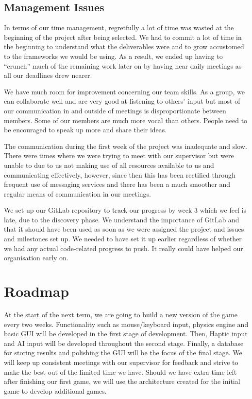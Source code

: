 \documentclass[a4paper]{article}
\begin{document}
\subsection{Management Issues}
In terms of our time management, regretfully a lot of time was wasted at the beginning of the project after being selected. We had to commit a lot of time in the beginning to understand what the deliverables were and to grow accustomed to the frameworks we would be using. As a result, we ended up having to “crunch” much of the remaining work later on by having near daily meetings as all our deadlines drew nearer.

We have much room for improvement concerning our team skills. As a group, we can collaborate well and are very good at listening to others’ input but most of our communication in and outside of meetings is disproportionate between members. Some of our members are much more vocal than others. People need to be encouraged to speak up more and share their ideas.

The communication during the first week of the project was inadequate and slow. There were times where we were trying to meet with our supervisor but were unable to due to us not making use of all resources available to us and communicating effectively, however, since then this has been rectified through frequent use of messaging services and there has been a much smoother and regular means of communication in our meetings. 

We set up our GitLab repository to track our progress by week 3 which we feel is late, due to the discovery phase. We understand the importance of GitLab and that it should have been used as soon as we were assigned the project and issues and milestones set up. We needed to have set it up earlier regardless of whether we had any actual code-related progress to push. It really could have helped our organisation early on.

\section{Roadmap}
At the start of the next term, we are going to build a new version of the game every two weeks. Functionality such as mouse/keyboard input, physics engine and basic GUI will be developed in the first stage of development. Then, Haptic input and AI input will be developed throughout the second stage. Finally, a database for storing results and polishing the GUI will be the focus of the final stage. We will keep up consistent meetings with our supervisor for feedback and strive to make the best out of the limited time we have. Should we have extra time left after finishing our first game, we will use the architecture created for the initial game to develop additional games.
\end{document}
